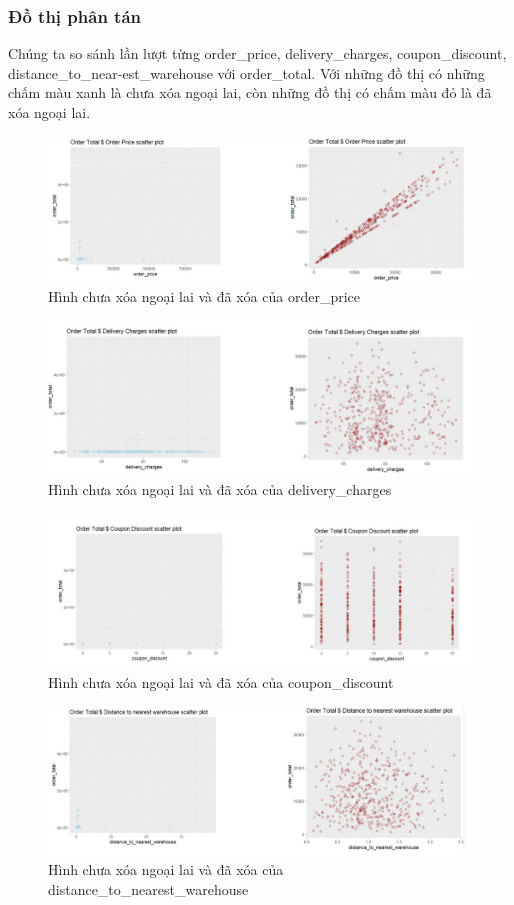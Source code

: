 \subsubsection{Đồ thị phân tán}
Chúng ta so sánh  lần lượt từng order\_price, delivery\_charges, coupon\_discount, distance\_to\_near-est\_warehouse với order\_total. Với những đồ thị có những chấm màu xanh là chưa xóa ngoại lai, còn những đồ thị có chấm màu đỏ là đã xóa ngoại lai.
\begin{figure}[!htbp]
    \centering
    \includegraphics[width=0.9\linewidth]{graphics/bang9.jpg}
    \caption{Hình chưa xóa ngoại lai và đã xóa của order\_price}
    \label{a}
\end{figure}
\begin{figure}[!htbp]
    \centering
    \includegraphics[width=0.8\linewidth]{graphics/bang10.jpg}
    \caption{Hình chưa xóa ngoại lai và đã xóa của delivery\_charges}
    \label{b}
\end{figure}
\begin{figure}[!htbp]
    \centering
    \includegraphics[width=0.8\linewidth]{graphics/bang11.jpg}
    \caption{Hình chưa xóa ngoại lai và đã xóa của coupon\_discount}
    \label{c}
\end{figure}
\begin{figure}[!htbp]
    \centering
    \includegraphics[width=0.8\linewidth]{graphics/bang12.jpg}
    \caption{Hình chưa xóa ngoại lai và đã xóa của distance\_to\_nearest\_warehouse}
    \label{d}
\end{figure}

